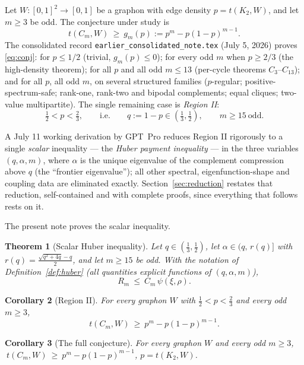 \documentclass[11pt]{article}
\newtheorem{theorem}{Theorem}[section]
\newtheorem{corollary}[theorem]{Corollary}
\begin{document}
Let $W:[0,1]^2\to[0,1]$ be a graphon with edge density $p=t(K_2,W)$, and let
$m\ge3$ be odd.  The conjecture under study is
\begin{equation}\label{eq:conj}
        t(C_m,W)\ \ge\ g_m(p):=p^m-p(1-p)^{m-1}.
\end{equation}
The consolidated record \texttt{earlier\_consolidated\_note.tex} (July 5, 2026) proves
\eqref{eq:conj}: for $p\le 1/2$ (trivial, $g_m(p)\le0$); for every odd $m$ when
$p\ge2/3$ (the high-density theorem); for all $p$ and all odd $m\le13$
(per-cycle theorems $C_3$--$C_{13}$); and for all $p$, all odd $m$, on several
structured families ($p$-regular; positive-spectrum-safe; rank-one, rank-two and
bipodal complements; equal cliques; two-value multipartite).  The single
remaining case is \emph{Region II}:
\[
        \tfrac12<p<\tfrac23,
        \qquad\text{i.e.}\qquad
        q:=1-p\in\left(\tfrac13,\tfrac12\right),
        \qquad m\ge15\ \text{odd}.
\]

A July 11 working derivation by GPT~Pro reduces Region II rigorously to a single \emph{scalar} inequality --- the
\emph{Huber payment inequality} --- in the three variables $(q,\alpha,m)$, where
$\alpha$ is the unique eigenvalue of the complement compression above $q$
(the ``frontier eigenvalue''); all other spectral, eigenfunction-shape and
coupling data are eliminated exactly.  Section~\ref{sec:reduction} restates that
reduction, self-contained and with complete proofs, since everything that
follows rests on it.

The present note proves the scalar inequality.

\begin{theorem}[Scalar Huber inequality]\label{thm:scalar}
Let $q\in(\tfrac13,\tfrac12)$, let $\alpha\in\bigl(q,\,r(q)\bigr]$ with
$r(q)=\frac{\sqrt{q^2+4q}-q}2$, and let $m\ge15$ be odd.  With the notation of
Definition~\ref{def:huber} (all quantities explicit functions of
$(q,\alpha,m)$),
\[
        R_m\ \le\ C_m\,\psi(\xi,\rho).
\]
\end{theorem}

\begin{corollary}[Region II]\label{cor:region2}
For every graphon $W$ with $\tfrac12<p<\tfrac23$ and every odd $m\ge3$,
\[
        t(C_m,W)\ \ge\ p^m-p(1-p)^{m-1}.
\]
\end{corollary}

\begin{corollary}[The full conjecture]\label{cor:full}
For every graphon $W$ and every odd $m\ge3$,
$\ t(C_m,W)\ \ge\ p^m-p(1-p)^{m-1}$, $p=t(K_2,W)$.
\end{corollary}
\end{document}
